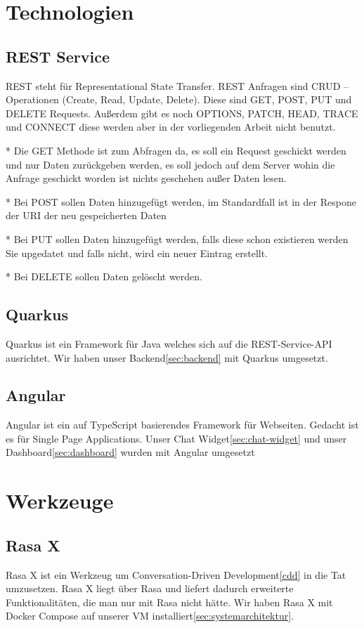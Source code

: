 \section{Technologien}

\subsection{REST Service}
REST steht für Representational State Transfer.
REST Anfragen sind CRUD – Operationen (Create, Read, Update, Delete).
Diese sind GET, POST, PUT und DELETE Requests.
Außerdem gibt es noch OPTIONS, PATCH, HEAD, TRACE
und CONNECT diese werden aber in der vorliegenden Arbeit nicht benutzt.

* Die GET Methode ist zum Abfragen da, es soll ein Request geschickt werden und nur Daten zurückgeben werden, es soll jedoch auf dem Server wohin die Anfrage geschickt worden ist nichts geschehen außer Daten lesen.

* Bei POST sollen Daten hinzugefügt werden, im Standardfall ist in der Respone der URI der neu gespeicherten Daten

* Bei PUT sollen Daten hinzugefügt werden, falls diese schon existieren werden Sie upgedatet und falls nicht, wird ein neuer Eintrag erstellt.

* Bei DELETE sollen Daten gelöscht werden.

\subsection{Quarkus}\label{quarkus}
Quarkus ist ein Framework für Java welches sich auf die REST-Service-API ausrichtet. Wir haben unser Backend\ref{sec:backend} mit Quarkus umgesetzt.

\subsection{Angular}
Angular ist ein auf TypeScript basierendes Framework für Webseiten.
Gedacht ist es für Single Page Applications.
Unser Chat Widget\ref{sec:chat-widget} und unser Dashboard\ref{sec:dashboard} wurden mit Angular umgesetzt



\section{Werkzeuge}

\subsection{Rasa X}\label{subsec:rasa-x}
Rasa X ist ein Werkzeug um Conversation-Driven Development\ref{cdd} in die Tat umzusetzen\cite{rasax}.
Rasa X liegt über Rasa und liefert dadurch erweiterte Funktionalitäten, die man nur mit Rasa nicht hätte.
Wir haben Rasa X mit Docker Compose\cite{rasaxDocker} auf unserer VM installiert\ref{sec:systemarchitektur}.

